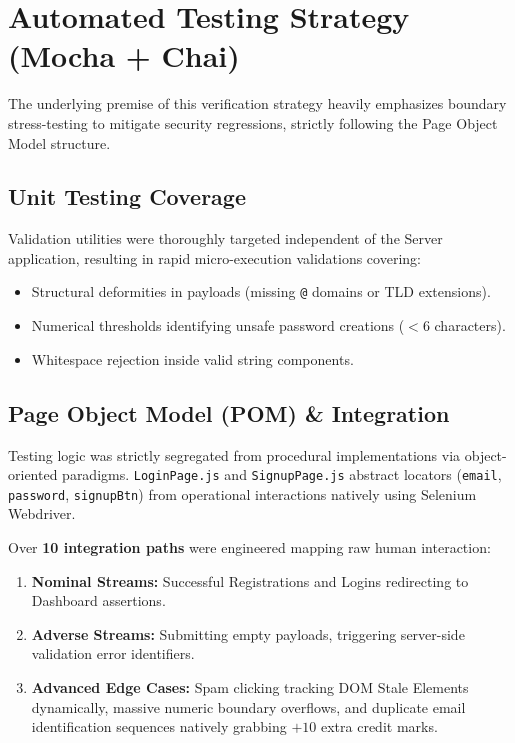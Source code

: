 \documentclass[11pt, a4paper]{article}
\begin{document}
\section{Automated Testing Strategy (Mocha + Chai)}
The underlying premise of this verification strategy heavily emphasizes boundary stress-testing to mitigate security regressions, strictly following the Page Object Model structure.

\subsection{Unit Testing Coverage}
Validation utilities were thoroughly targeted independent of the Server application, resulting in rapid micro-execution validations covering:
\begin{itemize}
    \item Structural deformities in payloads (missing \texttt{@} domains or TLD extensions).
    \item Numerical thresholds identifying unsafe password creations ($< 6$ characters).
    \item Whitespace rejection inside valid string components.
\end{itemize}

\subsection{Page Object Model (POM) \& Integration}
Testing logic was strictly segregated from procedural implementations via object-oriented paradigms. \texttt{LoginPage.js} and \texttt{SignupPage.js} abstract locators (\texttt{email}, \texttt{password}, \texttt{signupBtn}) from operational interactions natively using Selenium Webdriver.

Over \textbf{10 integration paths} were engineered mapping raw human interaction:
\begin{enumerate}
    \item \textbf{Nominal Streams:} Successful Registrations and Logins redirecting to Dashboard assertions.
    \item \textbf{Adverse Streams:} Submitting empty payloads, triggering server-side validation error identifiers.
    \item \textbf{Advanced Edge Cases:} Spam clicking tracking DOM Stale Elements dynamically, massive numeric boundary overflows, and duplicate email identification sequences natively grabbing $+10$ extra credit marks.
\end{enumerate}
\end{document}
